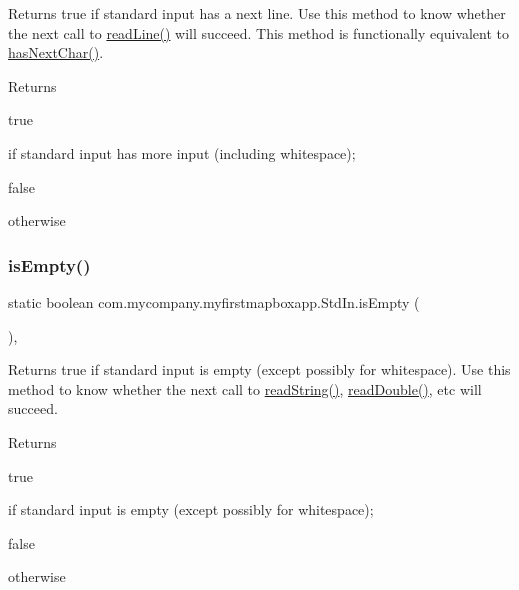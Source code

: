 Returns true if standard input has a next line. Use this method to know whether the next call to \hyperlink{classcom_1_1mycompany_1_1myfirstmapboxapp_1_1_std_in_a0ce2aa1a4c057b28a34bd07c54c45545}{read\+Line()} will succeed. This method is functionally equivalent to \hyperlink{classcom_1_1mycompany_1_1myfirstmapboxapp_1_1_std_in_ab46430a80e71ad8adc86ac0c068c20be}{has\+Next\+Char()}.

\begin{DoxyReturn}{Returns}

\begin{DoxyCode}
\textcolor{keyword}{true} 
\end{DoxyCode}
 if standard input has more input (including whitespace); 
\begin{DoxyCode}
\textcolor{keyword}{false} 
\end{DoxyCode}
 otherwise 
\end{DoxyReturn}
\mbox{\label{classcom_1_1mycompany_1_1myfirstmapboxapp_1_1_std_in_a4fbe6689243808b7cb6b38b4369983df}} 
\subsubsection{\texorpdfstring{is\+Empty()}{isEmpty()}}
{\footnotesize\ttfamily static boolean com.\+mycompany.\+myfirstmapboxapp.\+Std\+In.\+is\+Empty (\begin{DoxyParamCaption}{ }\end{DoxyParamCaption})\hspace{0.3cm}{\ttfamily [inline]}, {\ttfamily [static]}}

Returns true if standard input is empty (except possibly for whitespace). Use this method to know whether the next call to \hyperlink{classcom_1_1mycompany_1_1myfirstmapboxapp_1_1_std_in_aa787874d0065ebeb864a06b137a0250e}{read\+String()}, \hyperlink{classcom_1_1mycompany_1_1myfirstmapboxapp_1_1_std_in_a4eeca1a8d8f9ab168bbe9ddf87d9f3e5}{read\+Double()}, etc will succeed.

\begin{DoxyReturn}{Returns}

\begin{DoxyCode}
\textcolor{keyword}{true} 
\end{DoxyCode}
 if standard input is empty (except possibly for whitespace);
\begin{DoxyCode}
\textcolor{keyword}{false} 
\end{DoxyCode}
 otherwise 
\end{DoxyReturn}
\mbox{\label{classcom_1_1mycompany_1_1myfirstmapboxapp_1_1_std_in_a13cf05718702eb80b1199185c4b47a90}} 
